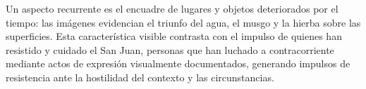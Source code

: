 Un aspecto recurrente es el encuadre de lugares y objetos deteriorados por el tiempo: las imágenes evidencian el triunfo del agua, el musgo y la hierba sobre las superficies. Esta característica visible contrasta con el impulso de quienes han resistido y cuidado el San Juan, personas que han luchado a contracorriente mediante actos de expresión visualmente documentados, generando impulsos de resistencia ante la hostilidad del contexto y las circunstancias.

